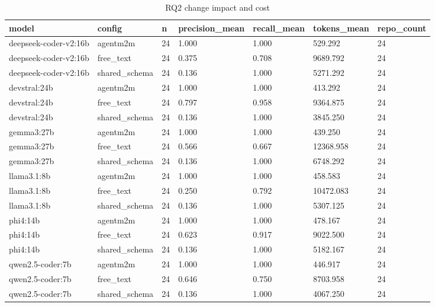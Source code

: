 \begin{table}[t]
\centering\small
\caption{RQ2 change impact and cost}\label{tab:rq2_by_model_config}
\begin{tabular}{lllllll}
\toprule
model & config & n & precision\_mean & recall\_mean & tokens\_mean & repo\_count \\
\midrule
deepseek-coder-v2:16b & agentm2m & 24 & 1.000 & 1.000 & 529.292 & 24 \\
deepseek-coder-v2:16b & free\_text & 24 & 0.375 & 0.708 & 9689.792 & 24 \\
deepseek-coder-v2:16b & shared\_schema & 24 & 0.136 & 1.000 & 5271.292 & 24 \\
devstral:24b & agentm2m & 24 & 1.000 & 1.000 & 413.292 & 24 \\
devstral:24b & free\_text & 24 & 0.797 & 0.958 & 9364.875 & 24 \\
devstral:24b & shared\_schema & 24 & 0.136 & 1.000 & 3845.250 & 24 \\
gemma3:27b & agentm2m & 24 & 1.000 & 1.000 & 439.250 & 24 \\
gemma3:27b & free\_text & 24 & 0.566 & 0.667 & 12368.958 & 24 \\
gemma3:27b & shared\_schema & 24 & 0.136 & 1.000 & 6748.292 & 24 \\
llama3.1:8b & agentm2m & 24 & 1.000 & 1.000 & 458.583 & 24 \\
llama3.1:8b & free\_text & 24 & 0.250 & 0.792 & 10472.083 & 24 \\
llama3.1:8b & shared\_schema & 24 & 0.136 & 1.000 & 5307.125 & 24 \\
phi4:14b & agentm2m & 24 & 1.000 & 1.000 & 478.167 & 24 \\
phi4:14b & free\_text & 24 & 0.623 & 0.917 & 9022.500 & 24 \\
phi4:14b & shared\_schema & 24 & 0.136 & 1.000 & 5182.167 & 24 \\
qwen2.5-coder:7b & agentm2m & 24 & 1.000 & 1.000 & 446.917 & 24 \\
qwen2.5-coder:7b & free\_text & 24 & 0.646 & 0.750 & 8703.958 & 24 \\
qwen2.5-coder:7b & shared\_schema & 24 & 0.136 & 1.000 & 4067.250 & 24 \\
\bottomrule
\end{tabular}
\end{table}

